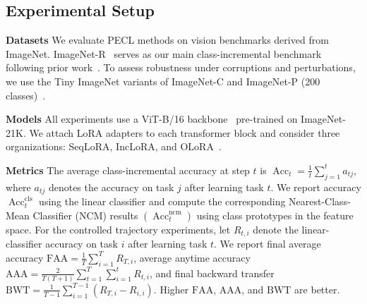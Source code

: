 \documentclass{article}
\begin{document}
\subsection{Experimental Setup}
\label{sec:exp_setup}

\noindent\textbf{Datasets}\quad
We evaluate PECL methods on vision benchmarks derived from ImageNet. ImageNet-R~\cite{ImagenetR_Hendrycks_2021_ICCV} serves as our main class-incremental benchmark following prior work~\cite{liangInfLoRAInterferenceFreeLowRank2024a}.
To assess robustness under corruptions and perturbations, we use the Tiny ImageNet variants of ImageNet-C and ImageNet-P (200 classes)~\cite{hendrycks2018benchmarking}.

\noindent\textbf{Models}\quad 
All experiments use a ViT-B/16 backbone~\cite{dosovitskiy2020image} pre-trained on ImageNet-21K.
We attach LoRA adapters to each transformer block and consider three organizations: SeqLoRA, IncLoRA, and OLoRA~\cite{wang2023orthogonal}.





\noindent\textbf{Metrics}\quad
The average class-incremental accuracy at step $t$ is
$
\operatorname{Acc}_t = \frac{1}{t} \sum_{j=1}^{t} a_{tj}
$,  where $a_{tj}$ denotes the accuracy on task $j$ after learning task $t$. 
We report accuracy $\operatorname{Acc}_t^{\mathrm{cls}}$ using the linear classifier and
compute the corresponding Nearest-Class-Mean Classifier (NCM) results
$(\operatorname{Acc}_t^{\mathrm{ncm}})$ using class prototypes in the feature space.
For the controlled trajectory experiments, let $R_{t,i}$ denote the linear-classifier accuracy on task $i$ after learning task $t$.
We report final average accuracy $\mathrm{FAA}=\frac{1}{T}\sum_{i=1}^{T}R_{T,i}$, average anytime accuracy $\mathrm{AAA}=\frac{2}{T(T+1)}\sum_{t=1}^{T}\sum_{i=1}^{t}R_{t,i}$, and final backward transfer $\mathrm{BWT}=\frac{1}{T-1}\sum_{i=1}^{T-1}(R_{T,i}-R_{i,i})$.
Higher $\mathrm{FAA}$, $\mathrm{AAA}$, and $\mathrm{BWT}$ are better.
\end{document}

